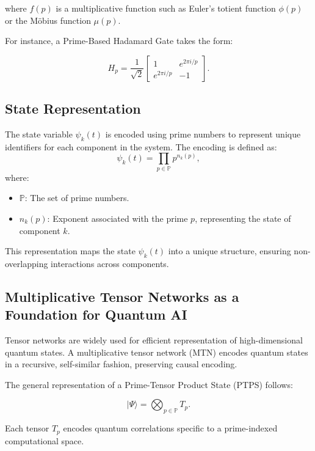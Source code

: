 \documentclass{article}
\theoremstyle{plain}
\begin{document}
where \( f(p) \) is a multiplicative function such as Euler's totient function \( \phi(p) \) or the Möbius function \( \mu(p) \).

For instance, a Prime-Based Hadamard Gate takes the form:

\begin{equation}
H_p = \frac{1}{\sqrt{2}} \begin{bmatrix}
1 & e^{2\pi i / p} \\
e^{2\pi i / p} & -1
\end{bmatrix}.
\end{equation}
\subsection{State Representation}
The state variable \(\psi_k(t)\) is encoded using prime numbers to represent unique identifiers for each component in the system. The encoding is defined as:
\begin{equation}
\psi_k(t) = \prod_{p \in \mathbb{P}} p^{n_k(p)},
\end{equation}
where:
\begin{itemize}
    \item \(\mathbb{P}\): The set of prime numbers.
    \item \(n_k(p)\): Exponent associated with the prime \(p\), representing the state of component \(k\).
\end{itemize}

This representation maps the state \(\psi_k(t)\) into a unique structure, ensuring non-overlapping interactions across components.

\subsection{Multiplicative Tensor Networks as a Foundation for Quantum AI}

Tensor networks are widely used for efficient representation of high-dimensional quantum states. A multiplicative tensor network (MTN) encodes quantum states in a recursive, self-similar fashion, preserving causal encoding.

The general representation of a Prime-Tensor Product State (PTPS) follows:

\begin{equation}
|\Psi\rangle = \bigotimes_{p \in \mathbb{P}} T_p.
\end{equation}

Each tensor \( T_p \) encodes quantum correlations specific to a prime-indexed computational space.
\end{document}
